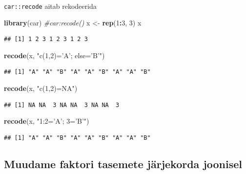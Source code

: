 \documentclass[]{book}
\newenvironment{Shaded}{\begin{snugshade}}{\end{snugshade}}
\newcommand{\KeywordTok}[1]{\textcolor[rgb]{0.13,0.29,0.53}{\textbf{#1}}}
\newcommand{\DecValTok}[1]{\textcolor[rgb]{0.00,0.00,0.81}{#1}}
\newcommand{\StringTok}[1]{\textcolor[rgb]{0.31,0.60,0.02}{#1}}
\newcommand{\CommentTok}[1]{\textcolor[rgb]{0.56,0.35,0.01}{\textit{#1}}}
\newcommand{\OperatorTok}[1]{\textcolor[rgb]{0.81,0.36,0.00}{\textbf{#1}}}
\newcommand{\NormalTok}[1]{#1}
\begin{document}
\texttt{car::recode} aitab rekodeerida

\begin{Shaded}
\begin{Highlighting}[]
\KeywordTok{library}\NormalTok{(car) }\CommentTok{#car:recode()}
\NormalTok{x <-}\StringTok{ }\KeywordTok{rep}\NormalTok{(}\DecValTok{1}\OperatorTok{:}\DecValTok{3}\NormalTok{, }\DecValTok{3}\NormalTok{)}
\NormalTok{x}
\end{Highlighting}
\end{Shaded}

\begin{verbatim}
## [1] 1 2 3 1 2 3 1 2 3
\end{verbatim}

\begin{Shaded}
\begin{Highlighting}[]
\KeywordTok{recode}\NormalTok{(x, }\StringTok{"c(1,2)='A'; else='B'"}\NormalTok{)}
\end{Highlighting}
\end{Shaded}

\begin{verbatim}
## [1] "A" "A" "B" "A" "A" "B" "A" "A" "B"
\end{verbatim}

\begin{Shaded}
\begin{Highlighting}[]
\KeywordTok{recode}\NormalTok{(x, }\StringTok{"c(1,2)=NA"}\NormalTok{)}
\end{Highlighting}
\end{Shaded}

\begin{verbatim}
## [1] NA NA  3 NA NA  3 NA NA  3
\end{verbatim}

\begin{Shaded}
\begin{Highlighting}[]
\KeywordTok{recode}\NormalTok{(x, }\StringTok{"1:2='A'; 3='B'"}\NormalTok{)}
\end{Highlighting}
\end{Shaded}

\begin{verbatim}
## [1] "A" "A" "B" "A" "A" "B" "A" "A" "B"
\end{verbatim}

\subsection{Muudame faktori tasemete järjekorda
joonisel}\label{muudame-faktori-tasemete-jarjekorda-joonisel}
\end{document}
